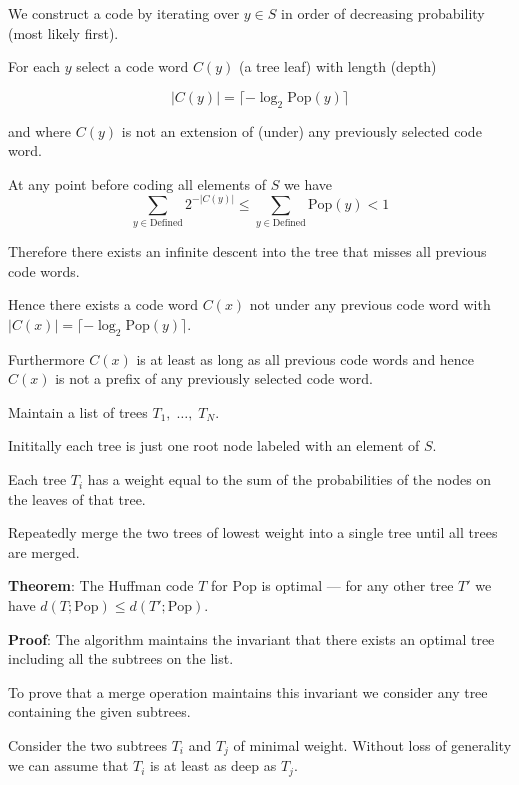 {

\vfill
We construct a code by iterating over $y \in S$ in order of decreasing probability (most likely first).

\vfill
For each $y$ select a code word $C(y)$ (a tree leaf) with length (depth)

\vfill
$$|C(y)| = \lceil - \log_2 \mathrm{Pop}(y)\rceil$$

\vfill
and where $C(y)$ is not an extension of (under) any previously selected code word.


At any point before coding all elements of $S$ we have
$$\sum_{y \in \mathrm{Defined}} 2^{-|C(y)|} \leq \sum_{y \in \mathrm{Defined}} \mathrm{Pop}(y) < 1$$

\vfill
Therefore there exists an infinite descent into the tree that misses all previous code words.

\vfill
Hence there exists a code word $C(x)$ not under any previous code word with
$|C(x)| = \lceil - \log_2 \mathrm{Pop}(y)\rceil$.

\vfill
Furthermore $C(x)$ is at least as long as all previous code words and hence $C(x)$ is not a prefix of any previously selected code word.


Maintain a list of trees $T_1,\;\dots,\;T_N$.

\vfill
Inititally each tree is just one root node labeled with an element of $S$.

\vfill
Each tree $T_i$ has a weight equal to the sum of the probabilities of the nodes on the leaves of that tree.

\vfill
Repeatedly merge the two trees of lowest weight into a single tree until all trees are merged.


{\bf Theorem}: The Huffman code $T$ for $\mathrm{Pop}$ is optimal --- for any other tree $T'$ we have $d(T;\mathrm{Pop}) \leq d(T';\mathrm{Pop})$.

\vfill
{\bf Proof}: The algorithm maintains the invariant that there exists an optimal tree including
all the subtrees on the list.

\vfill
To prove that a merge operation maintains this invariant we consider any tree containing the given subtrees.

\vfill
Consider the two subtrees $T_i$ and $T_j$ of minimal weight.  Without loss of generality we can assume that $T_i$ is at least as deep as $T_j$.

}
